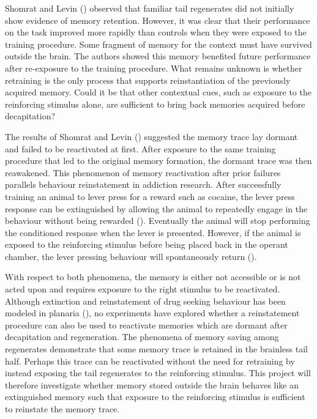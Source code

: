 \documentclass[
  jou,
  floatsintext,
  longtable,
  nolmodern,
  notxfonts,
  notimes,
  donotrepeattitle,
  colorlinks=true,linkcolor=blue,citecolor=blue,urlcolor=blue]{apa7}
\begin{document}
Shomrat and Levin () observed
that familiar tail regenerates did not initially show evidence of memory
retention. However, it was clear that their performance on the task
improved more rapidly than controls when they were exposed to the
training procedure. Some fragment of memory for the context must have
survived outside the brain. The authors showed this memory benefited
future performance after re-exposure to the training procedure. What
remains unknown is whether retraining is the only process that supports
reinstantiation of the previously acquired memory. Could it be that
other contextual cues, such as exposure to the reinforcing stimulus
alone, are sufficient to bring back memories acquired before
decapitation?

The results of Shomrat and Levin
() suggested the memory trace
lay dormant and failed to be reactivated at first. After exposure to the
same training procedure that led to the original memory formation, the
dormant trace was then reawakened. This phenomenon of memory
reactivation after prior failures parallels behaviour reinstatement in
addiction research. After successfully training an animal to lever press
for a reward such as cocaine, the lever press response can be
extinguished by allowing the animal to repeatedly engage in the
behaviour without being rewarded
().
Eventually the animal will stop performing the conditioned response when
the lever is presented. However, if the animal is exposed to the
reinforcing stimulus before being placed back in the operant chamber,
the lever pressing behaviour will spontaneously return
().

With respect to both phenomena, the memory is either not accessible or
is not acted upon and requires exposure to the right stimulus to be
reactivated. Although extinction and reinstatement of drug seeking
behaviour has been modeled in planaria
(), no experiments have explored whether a reinstatement procedure
can also be used to reactivate memories which are dormant after
decapitation and regeneration. The phenomena of memory saving among
regenerates demonstrate that some memory trace is retained in the
brainless tail half. Perhaps this trace can be reactivated without the
need for retraining by instead exposing the tail regenerates to the
reinforcing stimulus. This project will therefore investigate whether
memory stored outside the brain behaves like an extinguished memory such
that exposure to the reinforcing stimulus is sufficient to reinstate the
memory trace.
\end{document}
